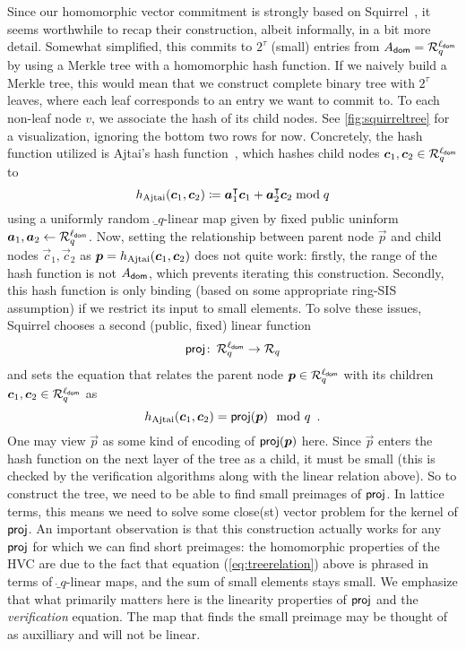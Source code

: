 Since our homomorphic vector commitment is strongly based on Squirrel~\cite{CCS:FleSimZha22}, it seems worthwhile to recap their construction, albeit informally, in a bit more detail.
Somewhat simplified, this commits to $2^\tau$ (small) entries from $A_{\mathsf{dom}} = \mathcal{R}_q^{\ell_{\mathsf{dom}}}$ by using a Merkle tree with a homomorphic hash function.
If we naively build a Merkle tree, this would mean that we construct complete binary tree with $2^\tau$ leaves, where each leaf corresponds to an entry we want to commit to.
To each non-leaf node $v$, we associate the hash of its child nodes.
See \autoref{fig:squirreltree} for a visualization, ignoring the bottom two rows for now.
Concretely, the hash function utilized is Ajtai's hash function~\cite{ICALP:Ajtai99}, which hashes child nodes $\boldsymbol{c}_1, \boldsymbol{c}_2\in\mathcal{R}_q^{\ell_{\mathsf{dom}}}$ to
\[
h_\mathrm{Ajtai}(\boldsymbol{c}_1,\boldsymbol{c}_2) \coloneqq \boldsymbol{a}_1^\intercal \boldsymbol{c}_1 + \boldsymbol{a}_2^\intercal \boldsymbol{c}_2 \bmod q
\]
using a uniformly random $\ring_q$-linear map given by fixed public uninform $\boldsymbol{a}_1,\boldsymbol{a}_2\gets \mathcal{R}_q^{\ell_{\mathsf{dom}}}$.
Now, setting the relationship between parent node $\vec{p}$ and child nodes $\vec{c}_1, \vec{c}_2$ as $\boldsymbol{p}=h_\mathrm{Ajtai}(\boldsymbol{c}_1,\boldsymbol{c}_2)$ does not quite work: firstly, the range of the hash function is not $A_{\mathsf{dom}}$, which prevents iterating this construction.
Secondly, this hash function is only binding (based on some appropriate ring-SIS assumption) if we restrict its input to small elements.
To solve these issues, Squirrel chooses a second (public, fixed) linear function
\[
\mathsf{proj}\colon\,\mathcal{R}_q^{\ell_{\mathsf{dom}}} \to \mathcal{R}_q
\]
and sets the equation that relates the parent node $\boldsymbol{p}\in\mathcal{R}_q^{\ell_{\mathsf{dom}}}$ with its children $\boldsymbol{c}_1,\boldsymbol{c}_2\in\mathcal{R}_q^{\ell_{\mathsf{dom}}}$ as
\begin{equation}
h_\mathrm{Ajtai}(\boldsymbol{c}_1,\boldsymbol{c}_2) = \mathsf{proj}(\boldsymbol{p}) \mod q\enspace. \label{eq:treerelation}
\end{equation}
%
One may view $\vec{p}$ as some kind of encoding of $\mathsf{proj}(\boldsymbol{p})$ here. Since $\vec{p}$ enters the hash function on the next layer of the tree as a child, it must be small (this is checked by the verification algorithms along with the linear relation above).
So to construct the tree, we need to be able to find small preimages of $\mathsf{proj}$.
In lattice terms, this means we need to solve some close(st) vector problem for the kernel of $\mathsf{proj}$.
An important observation is that this construction actually works for any $\mathsf{proj}$ for which we can find short preimages:
the homomorphic properties of the HVC are due to the fact that equation (\ref{eq:treerelation}) above
is phrased in terms of $\ring_q$-linear maps, and the sum of small elements stays small.
We emphasize that what primarily matters here is the linearity properties of $\mathsf{proj}$ and the \emph{verification} equation. The map that finds the small preimage may be thought of as auxilliary and will not be linear.

